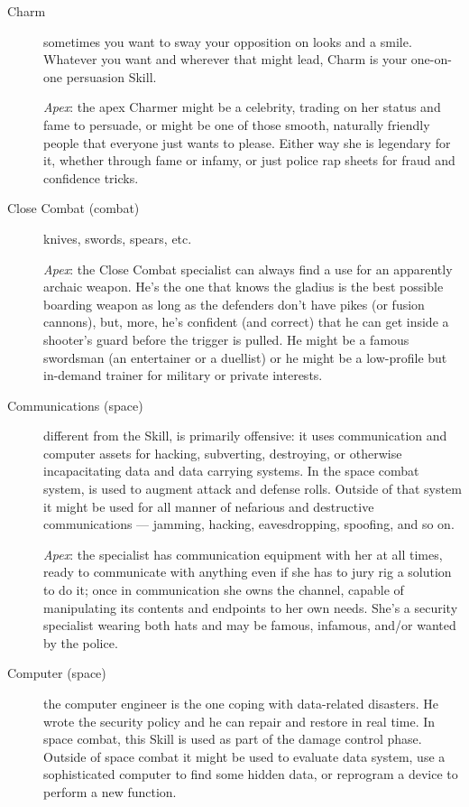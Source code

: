 \begin{description}
\item[Charm]
sometimes you want to sway your opposition on looks and a smile. Whatever you want and wherever that might lead, Charm is your one-on-one persuasion Skill.

\emph{Apex}: the apex Charmer might be a celebrity, trading on her status and fame to persuade, or might be one of those smooth, naturally friendly people that everyone just wants to please. Either way she is legendary for it, whether through fame or infamy, or just police rap sheets for fraud and confidence tricks.

\item[Close Combat (combat)]
knives, swords, spears, etc.

\emph{Apex}: the Close Combat specialist can always find a use for an apparently archaic weapon. He's the one that knows the gladius is the best possible boarding weapon as long as the defenders don't have pikes (or fusion cannons), but, more, he's confident (and correct) that he can get inside a shooter's guard before the trigger is pulled. He might be a famous swordsman (an entertainer or a duellist) or he might be a low-profile but in-demand trainer for military or private interests.

\item[Communications (space)]
different from the  Skill,  is primarily offensive: it uses communication and computer assets for hacking, subverting, destroying, or otherwise incapacitating data and data carrying systems. In the space combat system,  is used to augment  attack and defense rolls. Outside of that system it might be used for all manner of nefarious and destructive communications --- jamming, hacking, eavesdropping, spoofing, and so on.

\emph{Apex}: the  specialist has communication equipment with her at all times, ready to communicate with anything even if she has to jury rig a solution to do it; once in communication she owns the channel, capable of manipulating its contents and endpoints to her own needs. She's a security specialist wearing both hats and may be famous, infamous, and/or wanted by the police.

\item[Computer (space)]
the computer engineer is the one coping with da\-ta-re\-la\-ted disasters. He wrote the security policy and he can repair and restore in real time. In space combat, this Skill is used as part of the damage control phase.  Outside of space combat it might be used to evaluate data system, use a sophisticated computer to find some hidden data, or reprogram a device to perform a new function.


\end{description}
